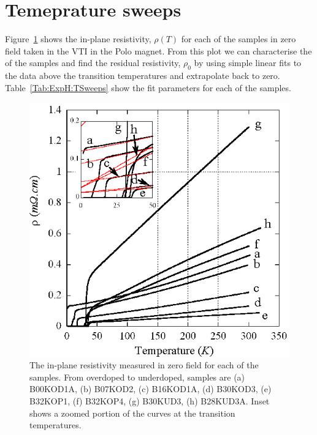 \section{Temeprature sweeps}

Figure~\ref{Fig:ExpH:TSweeps} shows the in-plane resistivity, $\rho(T)$ for each of the samples in zero field taken in the \ac{VTI} in the Polo magnet. From this plot we can characterise the \Tc of the samples and find the residual resistivity, $\rho_0$ by using simple linear fits to the data above the transition temperatures and extrapolate back to zero. Table~\ref{Tab:ExpH:TSweeps} show the fit parameters for each of the samples. 
\begin{figure}[htbp]
	\begin{center}
		\includegraphics[scale=0.9]{Chapter-HallBSCO/Figures/TSweeps/TSweeps}
		\caption{The in-plane resistivity measured in zero field for each of the samples. From overdoped to underdoped, samples are (a) B00KOD1A, (b) B07KOD2, (c) B16KOD1A, (d) B30KOD3, (e) B32KOP1, (f) B32KOP4, (g) B30KUD3, (h) B28KUD3A. Inset shows a zoomed portion of the curves at the transition temperatures.}
		\label{Fig:ExpH:TSweeps}
	\end{center}
\end{figure}

